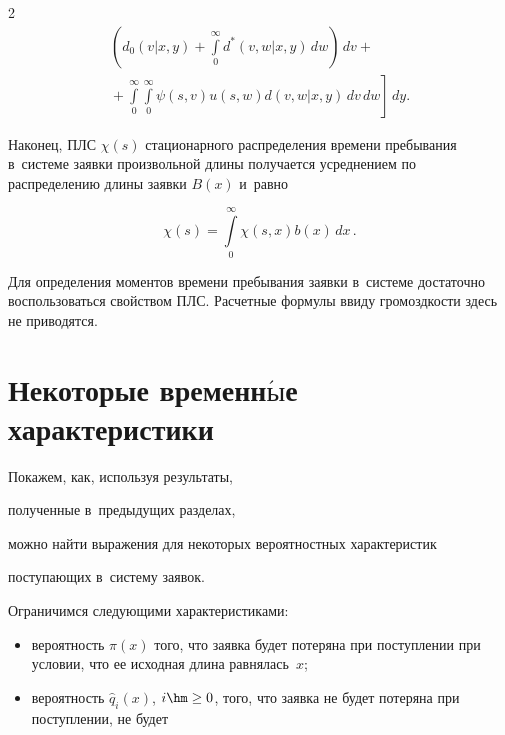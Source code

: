 \begin{multicols}{2}
\begin{multline*}
\left ( d_0(v|x,y)+\int\limits_0^\infty\! d^*(v,w|x,y)\,dw \right) \,dv


+{}


\\


{}+


\left.\int\limits_0^\infty\!


\int\limits_0^\infty\! \psi(s,v)u(s,w)d(v,w|x,y) \,dv  \, dw


\right] \,dy.


\end{multline*}





Наконец, ПЛС $\chi(s)$ стационарного распределения времени пребывания в~системе заявки произвольной длины получается усреднением по распределению длины заявки $B(x)$ и~равно


$$


\chi(s)=\int\limits_0^\infty\chi(s,x)b(x)\,dx\,.


$$





Для определения моментов времени пребывания заявки в~системе достаточно воспользоваться свойством ПЛС. Расчетные формулы ввиду громоздкости здесь не приводятся.





\section{Некоторые временн$\acute{\mbox{ы}}$е характеристики}





Покажем, как, используя  результаты,


полученные в~предыду\-щих разделах,


можно найти выражения для некоторых вероятностных характеристик


поступающих в~систему заявок.


Ограничимся следующими характеристиками:


\begin{itemize}


\item вероятность $\pi(x)$ того, что заявка будет потеряна при поступлении при условии, что ее исходная длина равнялась~$x$;


\item вероятность ${\widehat{q}_i(x)}$, $i\hm\ge 0$, того, что заявка не будет потеряна при поступлении, не будет



\end{itemize}
\end{multicols}
